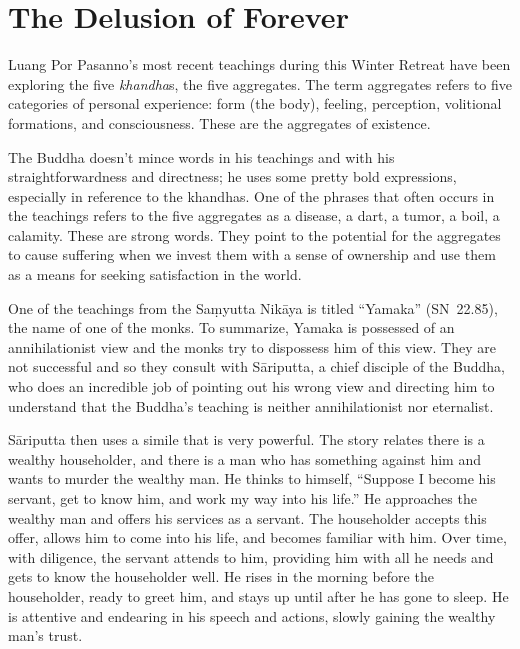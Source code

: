 
\chapter{The Delusion of Forever}


Luang Por Pasanno's most recent teachings during this Winter Retreat have been exploring the five \emph{khandha}s, the five aggregates. The term aggregates refers to five categories of personal experience: form (the body), feeling, perception, volitional formations, and consciousness. These are the aggregates of existence.

The Buddha doesn't mince words in his teachings and with his straightforwardness and directness; he uses some pretty bold expressions, especially in reference to the khandhas. One of the phrases that often occurs in the teachings refers to the five aggregates as a disease, a dart, a tumor, a boil, a calamity. These are strong words. They point to the potential for the aggregates to cause suffering when we invest them with a sense of ownership and use them as a means for seeking satisfaction in the world.

One of the teachings from the Saṃyutta Nikāya is titled ``Yamaka'' \mbox{(SN 22.85)}, the name of one of the monks. To \mbox{summarize}, Yamaka is possessed of an annihilationist view and the monks try to dispossess him of this view. They are not successful and so they consult with Sāriputta, a chief disciple of the Buddha, who does an incredible job of pointing out his wrong view and directing him to understand that the Buddha's teaching is neither annihilationist nor eternalist.

Sāriputta then uses a simile that is very powerful. The story relates there is a wealthy householder, and there is a man who has something against him and wants to murder the wealthy man. He thinks to himself, ``Suppose I become his servant, get to know him, and work my way into his life.'' He approaches the wealthy man and offers his services as a servant. The householder accepts this offer, allows him to come into his life, and becomes familiar with him. Over time, with diligence, the servant attends to him, providing him with all he needs and gets to know the householder well. He rises in the morning before the householder, ready to greet him, and stays up until after he has gone to sleep. He is attentive and endearing in his speech and actions, slowly gaining the wealthy man's trust.

